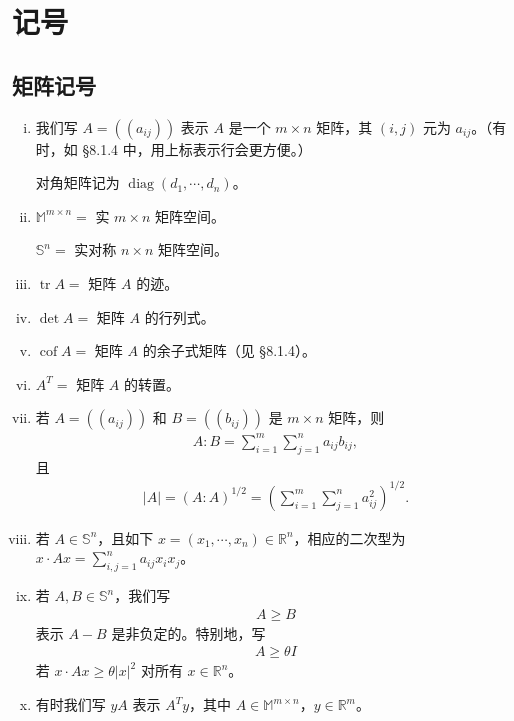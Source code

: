 \documentclass[../main.tex]{subfiles}
\begin{document}
\chapter{记号}\label{chapter:appA-记号}

\section{矩阵记号}\label{section:appA-矩阵记号}

\begin{enumerate}[(i)]
\item 我们写 $A=((a_{ij}))$ 表示 $A$ 是一个 $m\times n$ 矩阵，其 $(i,j)$ 元为 $a_{ij}$。（有时，如 \S8.1.4 中，用上标表示行会更方便。）

对角矩阵记为 $\operatorname{diag}(d_1,\cdots,d_n)$。

\item $\mathbb{M}^{m\times n}=$ 实 $m\times n$ 矩阵空间。

$\mathbb{S}^n=$ 实对称 $n\times n$ 矩阵空间。

\item $\operatorname{tr}A=$ 矩阵 $A$ 的迹。

\item $\det A=$ 矩阵 $A$ 的行列式。

\item $\operatorname{cof}A=$ 矩阵 $A$ 的余子式矩阵（见 \S8.1.4）。

\item $A^T=$ 矩阵 $A$ 的转置。

\item 若 $A=((a_{ij}))$ 和 $B=((b_{ij}))$ 是 $m\times n$ 矩阵，则
\begin{align*}
A:B=\sum_{i=1}^m\sum_{j=1}^n a_{ij}b_{ij},
\end{align*}
且
\begin{align*}
|A|=(A:A)^{1/2}=\left(\sum_{i=1}^m\sum_{j=1}^n a_{ij}^2\right)^{1/2}.
\end{align*}

\item 若 $A\in\mathbb{S}^n$，且如下 $x=(x_1,\cdots,x_n)\in\mathbb{R}^n$，相应的二次型为 $x\cdot Ax=\sum_{i,j=1}^n a_{ij}x_ix_j$。

\item 若 $A,B\in\mathbb{S}^n$，我们写
\begin{align*}
A\geqslant B
\end{align*}
表示 $A-B$ 是非负定的。特别地，写
\begin{align*}
A\geqslant\theta I
\end{align*}
若 $x\cdot Ax\geqslant\theta|x|^2$ 对所有 $x\in\mathbb{R}^n$。

\item 有时我们写 $yA$ 表示 $A^Ty$，其中 $A\in\mathbb{M}^{m\times n}$，$y\in\mathbb{R}^m$。
\end{enumerate}
\end{document}
